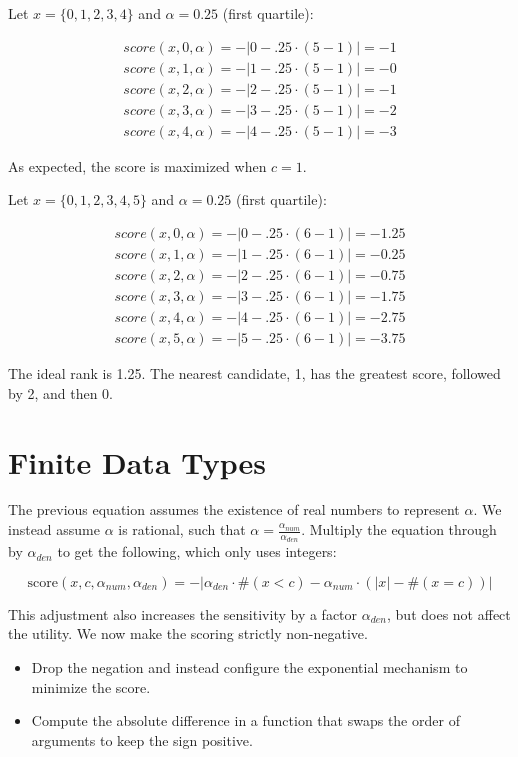 \documentclass{article}
\begin{document}
Let $x = \{0,1,2,3,4\}$ and $\alpha = 0.25$ (first quartile):

\begin{align*}
    score(x, 0, \alpha) = -|0 - .25 \cdot (5 - 1)| = -1 \\
    score(x, 1, \alpha) = -|1 - .25 \cdot (5 - 1)| = -0 \\
    score(x, 2, \alpha) = -|2 - .25 \cdot (5 - 1)| = -1 \\
    score(x, 3, \alpha) = -|3 - .25 \cdot (5 - 1)| = -2 \\
    score(x, 4, \alpha) = -|4 - .25 \cdot (5 - 1)| = -3
\end{align*}

As expected, the score is maximized when $c = 1$.

Let $x = \{0,1,2,3,4,5\}$ and $\alpha = 0.25$ (first quartile):

\begin{align*}
    score(x, 0, \alpha) = -|0 - .25 \cdot (6 - 1)| = -1.25 \\
    score(x, 1, \alpha) = -|1 - .25 \cdot (6 - 1)| = -0.25 \\
    score(x, 2, \alpha) = -|2 - .25 \cdot (6 - 1)| = -0.75 \\
    score(x, 3, \alpha) = -|3 - .25 \cdot (6 - 1)| = -1.75 \\
    score(x, 4, \alpha) = -|4 - .25 \cdot (6 - 1)| = -2.75 \\
    score(x, 5, \alpha) = -|5 - .25 \cdot (6 - 1)| = -3.75
\end{align*}

The ideal rank is 1.25. The nearest candidate, 1, has the greatest score, followed by 2, and then 0.


\section{Finite Data Types}
The previous equation assumes the existence of real numbers to represent $\alpha$.
We instead assume $\alpha$ is rational, such that $\alpha = \frac{\alpha_{num}}{\alpha_{den}}$.
Multiply the equation through by $\alpha_{den}$ to get the following,
which only uses integers:

\begin{equation}
    \textrm{score}(x, c, \alpha_{num}, \alpha_{den}) = -|\alpha_{den} \cdot \#(x < c) - \alpha_{num} \cdot (|x| - \#(x = c))|
\end{equation}

This adjustment also increases the sensitivity by a factor $\alpha_{den}$,
but does not affect the utility.
We now make the scoring strictly non-negative.
\begin{itemize}
    \item Drop the negation and instead configure the exponential mechanism to minimize the score.
    \item Compute the absolute difference in a function that swaps the order of arguments to keep the sign positive.
\end{itemize}
\end{document}
